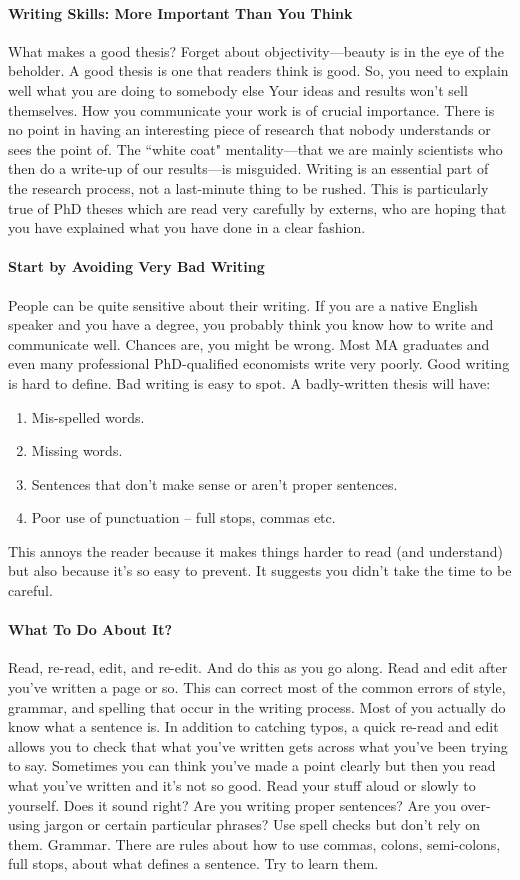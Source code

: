\paragraph{Writing Skills: More Important Than You Think}
What makes a good thesis? Forget about objectivity—beauty is in the eye of the beholder.
A good thesis is one that readers think is good.
So, you need to explain well what you are doing to somebody else Your ideas and results won’t sell themselves. How you communicate your work is of crucial importance.
There is no point in having an interesting piece of research that nobody understands or sees the point of.
The  ``white coat" mentality—that we are mainly scientists who then do a write-up of our results—is misguided.
Writing is an essential part of the research process, not a last-minute thing to be rushed.
This is particularly true of PhD theses which are read very carefully by externs, who are hoping that you have explained what you have done in a clear fashion.

\paragraph{Start by Avoiding Very Bad Writing}
People can be quite sensitive about their writing.
If you are a native English speaker and you have a degree, you probably think you know how to write and communicate well.
Chances are, you might be wrong.
Most MA graduates and even many professional PhD-qualified economists write very poorly.
Good writing is hard to define. Bad writing is easy to spot.
A badly-written thesis will have:
\begin{enumerate}
	\item Mis-spelled words.
	\item Missing words.
	\item Sentences that don’t make sense or aren’t proper sentences.
	\item Poor use of punctuation – full stops, commas etc.
\end{enumerate}
This annoys the reader because it makes things harder to read (and understand) but also because it’s so easy to prevent.
It suggests you didn’t take the time to be careful.

\paragraph{What To Do About It?}
Read, re-read, edit, and re-edit.
And do this as you go along.
Read and edit after you’ve written a page or so.
This can correct most of the common errors of style, grammar, and spelling that occur in the writing process.
Most of you actually do know what a sentence is.
In addition to catching typos, a quick re-read and edit allows you to check that what you’ve written gets across what you’ve been trying to say.
Sometimes you can think you’ve made a point clearly but then you read what you’ve written and it’s not so good.
Read your stuff aloud or slowly to yourself.
Does it sound right? Are you writing proper sentences? Are you over-using jargon or certain particular phrases?
Use spell checks but don’t rely on them.
Grammar. There are rules about how to use commas, colons, semi-colons, full stops, about what defines a sentence. Try to learn them.

